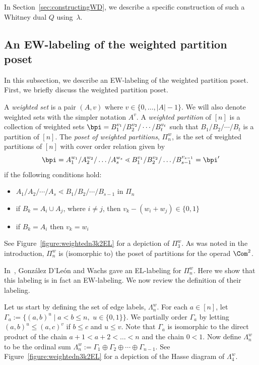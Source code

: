 In Section~\ref{sec:constructingWD}, we describe a specific construction of such a Whitney dual $Q$ using~$\lambda$. 

\subsection{An EW-labeling of the weighted partition poset}\label{sec:EWforWeighted}

In this subsection, we describe an EW-labeling of the weighted partition poset.  First, we briefly discuss the weighted partition poset.

A \emph{weighted set} is a pair $(A,v)$ where $v\in\{0,\dots, |A|-1\}$. We will also denote weighted sets with the simpler notation $A^v$. A \emph{weighted partition} of $[n]$ is a collection of weighted sets $\bpi=B_1^{v_1}/B_2^{v_2}/\cdots/B_t^{v_t}$  such that  
$B_1/B_2/\cdots/B_t$ is a partition of $[n]$. The \emph{poset of weighted partitions}, $\Pi_n^{w}$,  is the set of weighted 
partitions of $[n]$ with cover order relation given by 
$$\bpi=A_1^{w_1}/A_2^{w_2}/\dots /A_s^{w_s}\lessdot B_1^{v_1}/ B_2^{v_2}/ \dots /B_{s-1}^{v_{s-1}}=\bpi'$$ 
if the following conditions hold:
\begin{itemize}
 \item $A_1/A_2/\cdots /A_s \lessdot B_1/B_2/ \cdots /B_{s-1} $ in $\Pi_n$
 \item if $B_k=A_{i}\cup A_{j}$, where $i \ne j$, then $v_k-(w_{i} + w_{j}) \in \{0,1\}$
 \item if $B_k = A_i$ then $v_k = w_i$
 \end{itemize}
See Figure~\ref{figure:weightedn3k2EL} for a depiction of $\Pi_3^w$. As was noted in the introduction, $\Pi_n^w$ is (isomorphic to) the poset of partitions for the operad $\Com^2$.
 
In~\cite{GonzalezDleonWachs2016}, Gonz\'alez D'Le\'on and Wachs gave an EL-labeling for $\Pi_n^w$. Here we show that this labeling is in fact an EW-labeling.  We now review the definition of their labeling. 

Let us start by defining the set of edge labels, $\Lambda^w_n$. For each $a \in [n]$, let $\Gamma_a:= \{(a,b)^u \mid   
a<b \le n, \,\, u \in \{0,1\} \}$.  
We partially order $\Gamma_a$  by letting $(a,b)^u \le  (a,c)^v$ if $b\le  c$ and $u \le v$. Note that $\Gamma_a$ is isomorphic to the direct product of the chain $a+1< a+2 <\dots < n $ and
the chain $0 < 1$.  Now define $\Lambda^w_n$ to be the 
ordinal sum
$\Lambda^w_n := \Gamma_1 \oplus  \Gamma_2  \oplus \cdots \oplus \Gamma_{n-1}$. See Figure~\ref{figure:weightedn3k2EL} for a depiction of the Hasse diagram of $\Lambda^w_4$.

